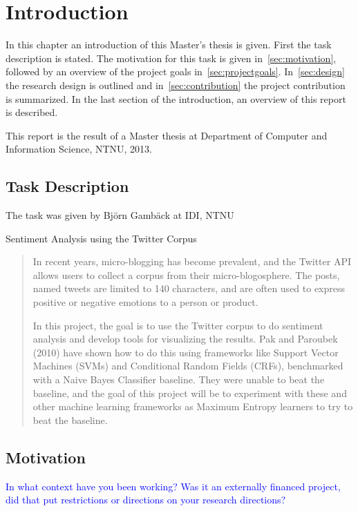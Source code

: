 \chapter{Introduction}

In this chapter an introduction of this Master's thesis is given. First the task description is stated. The motivation for this task is given in~\autoref{sec:motivation}, followed by an overview of the project goals in~\autoref{sec:projectgoals}. In~\autoref{sec:design} the research design is outlined and in~\autoref{sec:contribution} the project contribution is summarized. In the last section of the introduction, an overview of this report is described. 

This report is the result of a Master thesis at Department of Computer and Information Science, NTNU, 2013. 

\section{Task Description}
\label{sec:task}

The task was given by Bj\"{o}rn Gamb\"{a}ck at IDI, NTNU

\begin{center} \Large Sentiment Analysis using the Twitter Corpus \end{center}
\begin{quotation}
In recent years, micro-blogging has become prevalent, and the Twitter API allows users to collect a corpus from their micro-blogosphere. The posts, named tweets are limited to 140 characters, and are often used to express positive or negative emotions to a person or product.

In this project, the goal is to use the Twitter corpus to do sentiment analysis and develop tools for visualizing the results. Pak and Paroubek (2010) have shown how to do this using frameworks like Support Vector Machines (SVMs) and Conditional Random Fields (CRFs), benchmarked with a Naive Bayes Classifier baseline. They were unable to beat the baseline, and the goal of this project will be to experiment with these and other machine learning frameworks as Maximum Entropy learners to try to beat the baseline.
\end{quotation}


\section{Motivation}
\label{sec:motivation}
\textcolor{blue}{In what context have you been working? Was it an externally financed project, did that put restrictions or directions on your research directions?}

